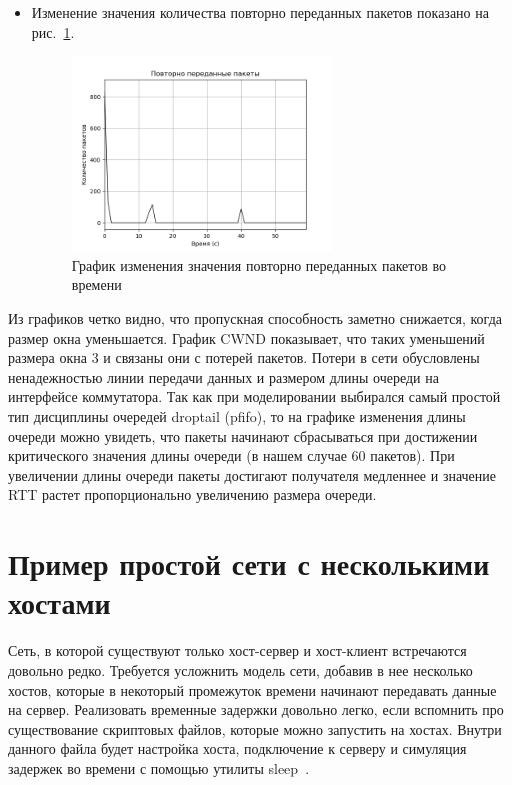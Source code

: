 \begin{itemize}
\item Изменение значения количества повторно переданных пакетов
  показано на рис.~\ref{fig:30011}.

\begin{figure}[H]
  \centering
  \includegraphics[width=0.65\textwidth]{image/ch03_01/retransmits.png}
\caption{График изменения значения повторно переданных пакетов во
  времени}
\label{fig:30011}
\end{figure}

\end{itemize}







Из графиков четко видно, что пропускная способность заметно снижается,
когда размер окна уменьшается. График CWND показывает, что таких
уменьшений размера окна 3 и связаны они с потерей пакетов. Потери в
сети обусловлены ненадежностью линии передачи данных и размером длины
очереди на интерфейсе коммутатора. Так как при моделировании выбирался
самый простой тип дисциплины очередей droptail (pfifo), то на графике
изменения длины очереди можно увидеть, что пакеты начинают
сбрасываться при достижении критического значения длины очереди (в
нашем случае 60 пакетов).  При увеличении длины
очереди пакеты достигают получателя медленнее и значение RTT растет
пропорционально увеличению размера очереди.

\section{Пример простой сети с несколькими хостами}

Сеть, в которой существуют только хост-сервер и хост-клиент встречаются
довольно редко. Требуется усложнить модель сети, добавив в нее несколько
хостов, которые в некоторый промежуток времени начинают передавать
данные на сервер. Реализовать временные задержки довольно легко, если
вспомнить про существование скриптовых файлов, которые можно запустить
на хостах. Внутри данного файла будет настройка хоста, подключение к
серверу и симуляция задержек во времени с помощью утилиты sleep~\cite{sleep}.


